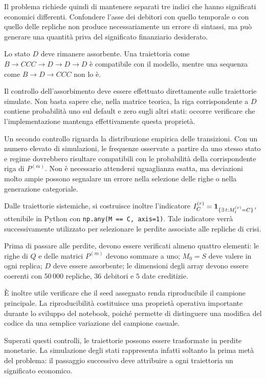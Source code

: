 Il problema richiede quindi di mantenere separati tre indici che hanno
significati economici differenti. Confondere l'asse dei debitori con quello
temporale o con quello delle repliche non produce necessariamente un errore
di sintassi, ma pu\`o generare una quantit\`a priva del significato
finanziario desiderato.

Lo stato $D$ deve rimanere assorbente. Una traiettoria come
$B\to CCC\to D\to D\to D$ \`e compatibile con il modello, mentre una
sequenza come $B\to D\to CCC$ non lo \`e.

Il controllo dell'assorbimento deve essere effettuato direttamente sulle
traiettorie simulate. Non basta sapere che, nella matrice teorica, la riga
corrispondente a $D$ contiene probabilit\`a uno sul default e zero sugli
altri stati: occorre verificare che l'implementazione mantenga effettivamente
questa propriet\`a.

Un secondo controllo riguarda la distribuzione empirica delle transizioni.
Con un numero elevato di simulazioni, le frequenze osservate a partire da uno
stesso stato e regime dovrebbero risultare compatibili con le probabilit\`a
della corrispondente riga di $P^{(m)}$. Non \`e necessario attendersi
uguaglianza esatta, ma deviazioni molto ampie possono segnalare un errore
nella selezione delle righe o nella generazione categoriale.

Dalle traiettorie sistemiche, si costruisce inoltre l'indicatore
$I_C^{(r)}=\mathbf{1}_{\{\exists\,t:M_t^{(r)}=C\}}$, ottenibile in Python con
\texttt{np.any(M == C, axis=1)}. Tale indicatore verr\`a successivamente
utilizzato per selezionare le perdite associate alle repliche di crisi.

Prima di passare alle perdite, devono essere verificati almeno quattro
elementi: le righe di $Q$ e delle matrici $P^{(m)}$ devono sommare a uno;
$M_0=S$ deve valere in ogni replica; $D$ deve essere assorbente; le
dimensioni degli array devono essere coerenti con $50\,000$ repliche,
$36$ debitori e $5$ date creditizie.

\`E inoltre utile verificare che il seed assegnato renda riproducibile il
campione principale. La riproducibilit\`a costituisce una propriet\`a
operativa importante durante lo sviluppo del notebook, poich\'e permette di
distinguere una modifica del codice da una semplice variazione del campione
casuale.

Superati questi controlli, le traiettorie possono essere trasformate in
perdite monetarie. La simulazione degli stati rappresenta infatti soltanto
la prima met\`a del problema: il passaggio successivo deve attribuire a ogni
traiettoria un significato economico.
%

